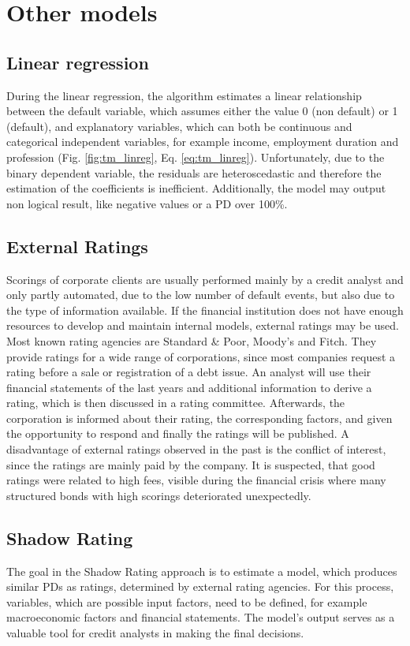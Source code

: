 \section{Other models}

\subsection{Linear regression}
During the linear regression, the algorithm estimates a linear relationship between the default variable, which assumes either the value 0 (non default) or 1 (default), and explanatory variables, which can both be continuous and categorical independent variables, for example income, employment duration and profession (Fig. \ref{fig:tm_linreg}, Eq. \ref{eq:tm_linreg}). Unfortunately, due to the binary dependent variable, the residuals are heteroscedastic and therefore the estimation of the coefficients is inefficient. Additionally, the model may output non logical result, like negative values or a PD over 100\%.

\subsection{External Ratings}
Scorings of corporate clients are usually performed mainly by a credit analyst and only partly automated, due to the low number of default events, but also due to the type of information available. If the financial institution does not have enough resources to develop and maintain internal models, external ratings may be used. Most known rating agencies are Standard \& Poor, Moody's and Fitch. They provide ratings for a wide range of corporations, since most companies request a rating before a sale or registration of a debt issue. An analyst will use their financial statements of the last years and additional information to derive a rating, which is then discussed in a rating committee. Afterwards, the corporation is informed about their rating, the corresponding factors, and given the opportunity to respond and finally the ratings will be published. A disadvantage of external ratings observed in the past is the conflict of interest, since the ratings are mainly paid by the company. It is suspected, that good ratings were related to high fees, visible during the financial crisis where many structured bonds with high scorings deteriorated unexpectedly. 

\subsection{Shadow Rating}
The goal in the Shadow Rating approach is to estimate a model, which produces similar PDs as ratings, determined by external rating agencies. For this process, variables, which are possible input factors, need to be defined, for example macroeconomic factors and financial statements. The model's output serves as a valuable tool for credit analysts in making the final decisions. 